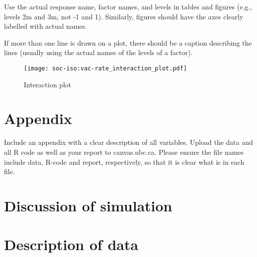 \documentclass[12pt,a4paper]{article}
\begin{document}
Use the actual response name, factor names, and levels in tables and figures (e.g., levels
2m and 3m, not -1 and 1). Similarly, figures should have the axes clearly labelled with
actual names.

If more than one line is drawn on a plot, there should be a caption describing the lines
(usually using the actual names of the levels of a factor).

\begin{figure}[H]
\texttt{[image: soc-iso:vac-rate\_interaction\_plot.pdf]}
\caption{Interaction plot}	 %
\label{soc.iso:vac.rate_interaction}
\end{figure}




\printbibliography





\renewcommand\theequation{\Alph{section}\arabic{equation}} %
\renewcommand\thefigure{\Alph{section}\arabic{figure}} %
\renewcommand\thetable{\Alph{section}\arabic{table}} %


\begin{appendices}

\section*{Appendix}

Include an appendix with a clear description of all variables. Upload
the data and all R code as well as your report to canvas.ubc.ca. Please ensure the file
names include data, R-code and report, respectively, so that it is clear what is in each
file.

\section{Discussion of simulation}

\section{Description of data}




\end{appendices}
\end{document}
